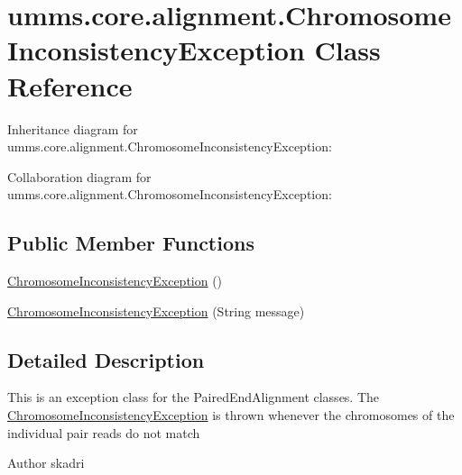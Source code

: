 \hypertarget{classumms_1_1core_1_1alignment_1_1_chromosome_inconsistency_exception}{\section{umms.\+core.\+alignment.\+Chromosome\+Inconsistency\+Exception Class Reference}
\label{classumms_1_1core_1_1alignment_1_1_chromosome_inconsistency_exception}
}


Inheritance diagram for umms.\+core.\+alignment.\+Chromosome\+Inconsistency\+Exception\+:


Collaboration diagram for umms.\+core.\+alignment.\+Chromosome\+Inconsistency\+Exception\+:
\subsection*{Public Member Functions}
\begin{DoxyCompactItemize}
\item 
\hyperlink{classumms_1_1core_1_1alignment_1_1_chromosome_inconsistency_exception_ac34fbdafac04c3b356c31ffd94c87638}{Chromosome\+Inconsistency\+Exception} ()
\item 
\hyperlink{classumms_1_1core_1_1alignment_1_1_chromosome_inconsistency_exception_aac0a753eb4c35f288d4983fac4a0fe97}{Chromosome\+Inconsistency\+Exception} (String message)
\end{DoxyCompactItemize}


\subsection{Detailed Description}
This is an exception class for the Paired\+End\+Alignment classes. The \hyperlink{classumms_1_1core_1_1alignment_1_1_chromosome_inconsistency_exception}{Chromosome\+Inconsistency\+Exception} is thrown whenever the chromosomes of the individual pair reads do not match \begin{DoxyAuthor}{Author}
skadri 
\end{DoxyAuthor}


